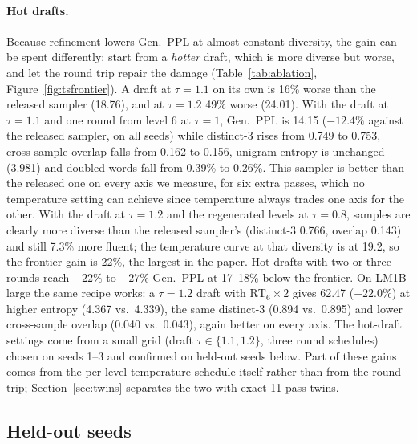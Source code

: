 \documentclass[10pt]{article}
\newcommand{\RT}[1]{\mathrm{RT}_{#1}}
\begin{document}
\paragraph{Hot drafts.} Because refinement lowers Gen.\ PPL at almost constant diversity, the gain can be spent differently: start from a \emph{hotter} draft, which is more diverse but worse, and let the round trip repair the damage (Table~\ref{tab:ablation}, Figure~\ref{fig:tsfrontier}). A draft at $\tau{=}1.1$ on its own is 16\% worse than the released sampler (18.76), and at $\tau{=}1.2$ 49\% worse (24.01). With the draft at $\tau{=}1.1$ and one round from level 6 at $\tau{=}1$, Gen.\ PPL is 14.15 ($-12.4\%$ against the released sampler, on all seeds) while distinct-3 rises from 0.749 to 0.753, cross-sample overlap falls from 0.162 to 0.156, unigram entropy is unchanged (3.981) and doubled words fall from 0.39\% to 0.26\%. This sampler is better than the released one on every axis we measure, for six extra passes, which no temperature setting can achieve since temperature always trades one axis for the other. With the draft at $\tau{=}1.2$ and the regenerated levels at $\tau{=}0.8$, samples are clearly more diverse than the released sampler's (distinct-3 0.766, overlap 0.143) and still 7.3\% more fluent; the temperature curve at that diversity is at 19.2, so the frontier gain is 22\%, the largest in the paper. Hot drafts with two or three rounds reach $-22\%$ to $-27\%$ Gen.\ PPL at 17--18\% below the frontier. On LM1B large the same recipe works: a $\tau{=}1.2$ draft with $\RT{6}{\times}2$ gives 62.47 ($-22.0\%$) at higher entropy (4.367 vs.\ 4.339), the same distinct-3 (0.894 vs.\ 0.895) and lower cross-sample overlap (0.040 vs.\ 0.043), again better on every axis. The hot-draft settings come from a small grid (draft $\tau \in \{1.1, 1.2\}$, three round schedules) chosen on seeds 1--3 and confirmed on held-out seeds below. Part of these gains comes from the per-level temperature schedule itself rather than from the round trip; Section~\ref{sec:twins} separates the two with exact 11-pass twins.

\subsection{Held-out seeds}
\label{sec:heldout}
\end{document}
